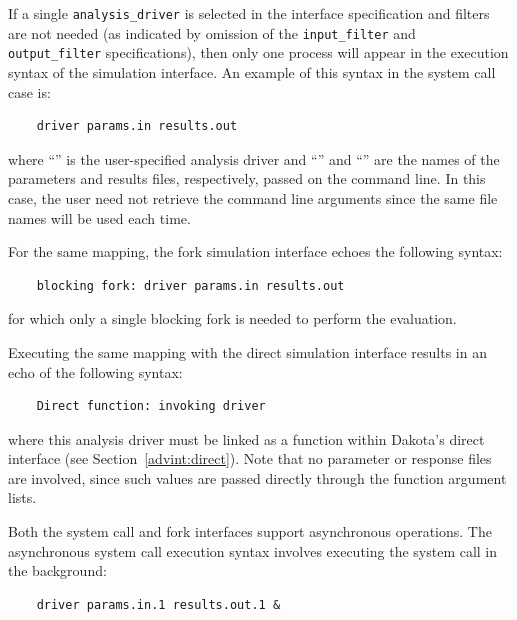 If a single \texttt{analysis\_driver} is selected in the interface
specification and filters are not needed (as indicated by omission of
the \texttt{input\_filter} and \texttt{output\_filter}
specifications), then only one process will appear in the execution
syntax of the simulation interface. An example of this syntax in the
system call case is:
\begin{small}
\begin{verbatim}
    driver params.in results.out
\end{verbatim}
\end{small}

where ``'' is the user-specified analysis driver and
``'' and ``'' are the names of the
parameters and results files, respectively, passed on the command
line. In this case, the user need not retrieve the command line
arguments since the same file names will be used each time.

For the same mapping, the fork simulation interface echoes the
following syntax:
\begin{small}
\begin{verbatim}
    blocking fork: driver params.in results.out
\end{verbatim}
\end{small}

for which only a single blocking fork is needed to perform the
evaluation.

Executing the same mapping with the direct simulation interface
results in an echo of the following syntax:
\begin{small}
\begin{verbatim}
    Direct function: invoking driver
\end{verbatim}
\end{small}

where this analysis driver must be linked as a function within
Dakota's direct interface (see Section~\ref{advint:direct}). Note that
no parameter or response files are involved, since such values
are passed directly through the function argument lists.

Both the system call and fork interfaces support asynchronous
operations. The asynchronous system call execution syntax involves
executing the system call in the background:
\begin{small}
\begin{verbatim}
    driver params.in.1 results.out.1 &
\end{verbatim}
\end{small}

